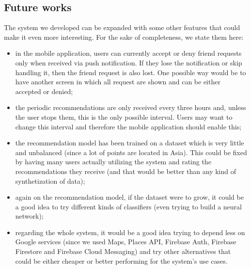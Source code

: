 \documentclass[../../main]{subfiles}
\begin{document}
\subsection{Future works}
\label{ss:future-works}

The system we developed can be expanded with some other features that could make it even more interesting. For the sake of completeness, we state them here:
\begin{itemize}
    \item in the mobile application, users can currently accept or deny friend requests only when received via push notification. 
    If they lose the notification or skip handling it, then the friend request is also lost.
    One possible way would be to have another screen in which all request are shown and can be either accepted or denied;
    \item the periodic recommendations are only received every three hours and, unless the user stops them, this is the only possible interval.
    Users may want to change this interval and therefore the mobile application should enable this;
    \item the recommendation model has been trained on a dataset which is very little and unbalanced (since a lot of points are located in Asia).
    This could be fixed by having many users actually utilizing the system and rating the recommendations they receive (and that would be better than any kind of synthetization of data);
    \item again on the recommendation model, if the dataset were to grow, it could be a good idea to try different kinds of classifiers (even trying to build a neural network);
    \item regarding the whole system, it would be a good idea trying to depend less on Google services (since we used Maps, Places API, Firebase Auth, Firebase Firestore and Firebase Cloud Messaging) and try other alternatives that could be either cheaper or better performing for the system's use cases.
\end{itemize}
\end{document}
